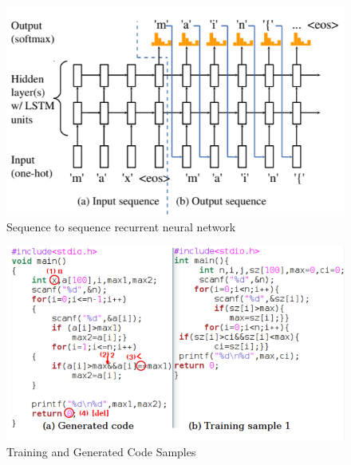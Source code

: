 \documentclass[conference, onecolumn, a4, 12pt]{IEEEtran}
\begin{document}
\begin{figure}
	\centering
	\includegraphics[width=0.7\linewidth]{sequence_to_sequence_recurrent_neural}
	\caption{Sequence to sequence recurrent neural network}
	\label{fig:sequencetosequencerecurrentneural}
\end{figure}

\begin{figure}
	\centering
	\includegraphics[width=0.7\linewidth]{Training_and_generated_code}
	\caption{Training and Generated Code Samples}
	\label{fig:trainingandgeneratedcode}
\end{figure}
\end{document}
